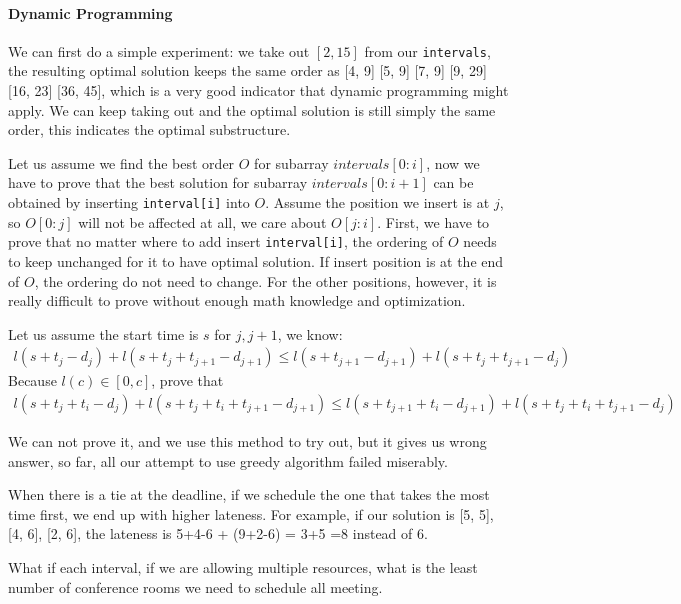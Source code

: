 \documentclass[../main.tex]{subfiles}
\begin{document}
\paragraph{Dynamic Programming} We can first do a simple experiment: we take out $[2, 15]$ from our \texttt{intervals}, the resulting optimal solution keeps the same order as [4, 9] [5, 9] [7, 9] [9, 29] [16, 23] [36, 45], which is a very good indicator that dynamic programming might apply. We can keep taking out and the optimal solution is still simply the same order, this indicates the optimal substructure. 

Let us assume we find the best order $O$ for subarray $intervals[0:i]$, now we have to prove that the best solution for subarray $intervals[0:i+1]$ can be obtained by inserting \texttt{interval[i]} into $O$. Assume the position we insert is at $j$, so $O[0:j]$ will not be affected at all, we care about $O[j:i]$. First, we have to prove that no matter where to add insert \texttt{interval[i]}, the ordering of $O$ needs to keep unchanged for it to have optimal solution. If insert position is at the end of $O$, the ordering do not need to change. For the other positions, however, it is really difficult to prove without enough math knowledge and optimization. 

Let us assume the start time is $s$ for $j, j+1$, we know:
\begin{align}
    l(s+t_j-d_j)+l(s+t_j+t_{j+1}-d_{j+1}) \leq l(s+t_{j+1}-d_{j+1})+l(s+t_j+t_{j+1}-d_{j})
\end{align}
Because $l(c)\in[0, c]$, prove that 
\begin{align}
    l(s+t_j+t_i-d_j)+l(s+t_j+t_i+t_{j+1}-d_{j+1} )\leq l(s+t_{j+1}+t_i-d_{j+1})+l(s+t_j+t_i+t_{j+1}-d_{j})
\end{align}

We can not prove it, and we use this method to try out, but it gives us wrong answer, so far, all our attempt to use greedy algorithm failed miserably. 


When there is a tie at the deadline, if we schedule the one that takes the most time first, we end up with higher lateness. For example, if our solution is [5, 5], [4, 6], [2, 6], the lateness is 5+4-6 + (9+2-6) = 3+5 =8 instead of 6. 

\begin{bclogo}[couleur = blue!30, arrondi=0.1,logo=\bccrayon,ombre=true]{What if each interval, if we are allowing multiple resources, what is the least number of conference rooms we need to schedule all meeting. } 
\end{bclogo}
\end{document}
